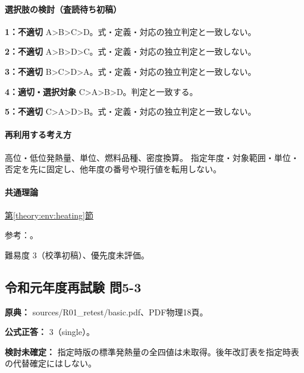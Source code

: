 \paragraph{選択肢の検討（査読待ち初稿）}\mbox{}\par

\noindent\textbf{1：不適切} A>B>C>D。式・定義・対応の独立判定と一致しない。\par

\noindent\textbf{2：不適切} A>B>D>C。式・定義・対応の独立判定と一致しない。\par

\noindent\textbf{3：不適切} B>C>D>A。式・定義・対応の独立判定と一致しない。\par

\noindent\textbf{4：適切・選択対象} C>A>B>D。判定と一致する。\par

\noindent\textbf{5：不適切} C>A>D>B。式・定義・対応の独立判定と一致しない。\par

\paragraph{再利用する考え方} 高位・低位発熱量、単位、燃料品種、密度換算。 指定年度・対象範囲・単位・否定を先に固定し、他年度の番号や現行値を転用しない。

\paragraph{共通理論} \hyperref[theory:env:heating]{第\ref*{theory:env:heating}節}

\par 参考：\cite{env58_heating}。

\par 難易度 3（校準初稿）、優先度未評価。

\subsection{令和元年度再試験 問5-3}
\label{q:r01-ret-basic-5-3}

\noindent\textbf{原典：} sources/R01\_retest/basic.pdf、PDF物理18頁。

\textbf{公式正答：} 3（single）。

\par\textbf{検討未確定：} 指定時版の標準発熱量の全四値は未取得。後年改訂表を指定時表の代替確定にはしない。

